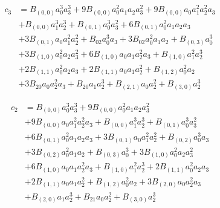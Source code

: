\documentclass[
10pt, %
a4paper, %
oneside, %
headinclude,footinclude, %
BCOR5mm, %
]{scrartcl}
\begin{document}
\begin{equation}
\begin{split}
  c_3 &= B_{(0,0)} a_{0}^{3} a_{3}^{3} + 9 B_{(0,0)} a_{0}^{2} a_{1} a_{2} a_{3}^{2} + 9 B_{(0,0)} a_{0} a_{1}^{2} a_{2}^{2} a_{3} \\
  &+ B_{(0,0)} a_{1}^{3} a_{2}^{3} + B_{(0,1)} a_{0}^{3} a_{3}^{2} + 6 B_{(0,1)} a_{0}^{2} a_{1} a_{2} a_{3} \\
  &+ 3 B_{(0,1)} a_{0} a_{1}^{2} a_{2}^{2} + B_{02} a_{0}^{3} a_{3} + 3 B_{02} a_{0}^{2} a_{1} a_{2} + B_{(0,3)} a_{0}^{3} \\
  &+ 3 B_{(1,0)} a_{0}^{2} a_{2} a_{3}^{2} + 6 B_{(1,0)} a_{0} a_{1} a_{2}^{2} a_{3} + B_{(1,0)} a_{1}^{2} a_{2}^{3} \\
  &+ 2 B_{(1,1)} a_{0}^{2} a_{2} a_{3} + 2 B_{(1,1)} a_{0} a_{1} a_{2}^{2} + B_{(1,2)} a_{0}^{2} a_{2} \\
  &+ 3 B_{20} a_{0} a_{2}^{2} a_{3} + B_{20} a_{1} a_{2}^{3} + B_{(2,1)} a_{0} a_{2}^{2} + B_{(3,0)} a_{2}^{3}
\end{split}
\end{equation}

\begin{equation}
\begin{split}
  c_2 &= B_{(0,0)} a_{0}^{3} a_{3}^{3} + 9 B_{(0,0)} a_{0}^{2} a_{1} a_{2} a_{3}^{2} \\
  &+ 9 B_{(0,0)} a_{0} a_{1}^{2} a_{2}^{2} a_{3} + B_{(0,0)} a_{1}^{3} a_{2}^{3} + B_{(0,1)} a_{0}^{3} a_{3}^{2} \\
  &+ 6 B_{(0,1)} a_{0}^{2} a_{1} a_{2} a_{3} + 3 B_{(0,1)} a_{0} a_{1}^{2} a_{2}^{2} + B_{(0,2)} a_{0}^{3} a_{3} \\
  &+ 3 B_{(0,2)} a_{0}^{2} a_{1} a_{2} + B_{(0,3)} a_{0}^{3} + 3 B_{(1,0)} a_{0}^{2} a_{2} a_{3}^{2} \\
  &+ 6 B_{(1,0)} a_{0} a_{1} a_{2}^{2} a_{3} + B_{(1,0)} a_{1}^{2} a_{2}^{3} + 2 B_{(1,1)} a_{0}^{2} a_{2} a_{3} \\
  &+ 2 B_{(1,1)} a_{0} a_{1} a_{2}^{2} + B_{(1,2)} a_{0}^{2} a_{2} + 3 B_{(2,0)} a_{0} a_{2}^{2} a_{3} \\
  &+ B_{(2,0)} a_{1} a_{2}^{3} + B_{21} a_{0} a_{2}^{2} + B_{(3,0)} a_{2}^{3}
\end{split}
\end{equation}
\end{document}
